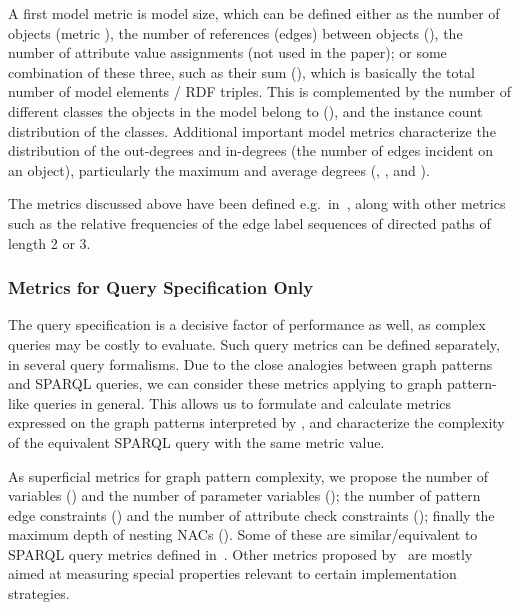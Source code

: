 A first model metric is model size, which can be defined either as the
number of objects (metric ), the number of references (edges)
between objects (), the number of attribute value assignments
(not used in the paper);
or some combination of
these three, such as their sum (), which is basically the
total number of model elements / RDF triples. This is complemented by the number
of different classes the objects in the model belong to (), and
the instance count distribution of the classes. %
Additional important model metrics characterize the distribution of the
out-degrees and in-degrees (the number of edges incident on an object),
particularly the maximum and average degrees (,
,  and ).
 
The metrics discussed above have been defined e.g.\ in~\cite{COLD2012-analysis-DBLP:conf/semweb/StarkaSM12}, along with other
metrics such as the relative frequencies of the edge label sequences of directed
paths of length 2 or 3.
 
\subsubsection{Metrics for Query Specification Only}
The query specification is a decisive factor of performance as well, as complex
queries may be costly to evaluate. Such query metrics can be defined separately,
in several query formalisms. Due to the
close analogies between graph patterns and SPARQL queries, we can consider these
metrics applying to graph pattern-like queries in general. This allows us to
formulate and calculate metrics expressed on the graph patterns interpreted by
\incquery{}, and characterize the complexity of the equivalent SPARQL query with
the same metric value.

As superficial metrics for graph pattern complexity, we propose the number of
variables () and the number of parameter variables
(); the number of pattern edge constraints
() and the number of attribute check constraints
(); finally the maximum depth of nesting NACs
(). Some of these are similar/equivalent to 
SPARQL query metrics defined in~\cite{SPLODGE}. Other metrics proposed
by~\cite{SPLODGE} are mostly aimed at measuring special properties relevant to
certain implementation strategies.

